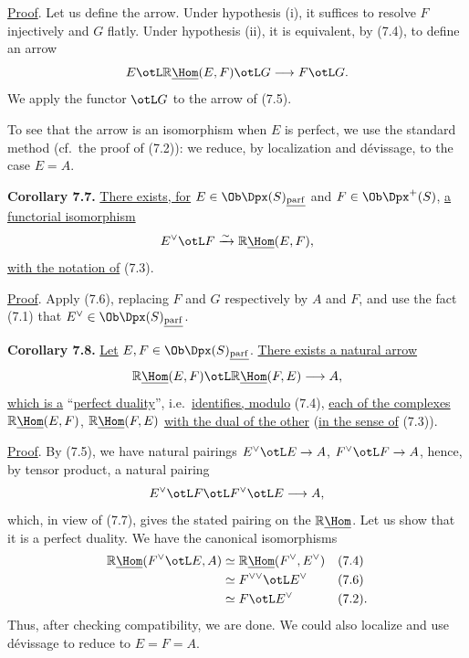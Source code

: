 \uline{Proof}. Let us define the arrow. Under hypothesis (i), it suffices to resolve \(F\) injectively and \(G\) flatly. Under hypothesis (ii), it is equivalent, by (7.4), to define an arrow
\[
  E\otL\mathbb{R}\underline{\Hom}(E,F)\otL G\longrightarrow F\otL G.
\]
We apply the functor \(\otL G\) to the arrow of (7.5).

To see that the arrow is an isomorphism when \(E\) is perfect, we use the standard method (cf.\ the proof of (7.2)): we reduce, by localization and dévissage, to the case \(E=A\).

%
\textbf{Corollary 7.7.} \uline{There exists, for} \(E\in\Ob\Dpx(S)_{\underline{\mathrm{parf}}}\) and \(F\in\Ob\Dpx^+(S)\), \uline{a functorial isomorphism}
\[
  E^\vee\otL F\xrightarrow{\sim}\mathbb{R}\underline{\Hom}(E,F),
\]
\uline{with the notation of} (7.3).

\uline{Proof}. Apply (7.6), replacing \(F\) and \(G\) respectively by \(A\) and \(F\), and use the fact (7.1) that \(E^\vee\in\Ob\Dpx(S)_{\underline{\mathrm{parf}}}\).

\textbf{Corollary 7.8.} \uline{Let} \(E,F\in\Ob\Dpx(S)_{\underline{\mathrm{parf}}}\). \uline{There exists a natural arrow}
\[
  \mathbb{R}\underline{\Hom}(E,F)\otL\mathbb{R}\underline{\Hom}(F,E)\longrightarrow A,
\]
\uline{which is a} ``\uline{perfect duality}'', i.e.\ \uline{identifies, modulo} (7.4), \uline{each of the complexes} \(\mathbb{R}\underline{\Hom}(E,F)\), \(\mathbb{R}\underline{\Hom}(F,E)\) \uline{with the dual of the other} (\uline{in the sense of} (7.3)).

\uline{Proof}. By (7.5), we have natural pairings \(E^\vee\otL E\to A\), \(F^\vee\otL F\to A\), hence, by tensor product, a natural pairing
\[
  E^\vee\otL F\otL F^\vee\otL E\longrightarrow A,
\]
which, in view of (7.7), gives the stated pairing on the \(\mathbb{R}\underline{\Hom}\). Let us show that it is a perfect duality. We have the canonical isomorphisms
\[
\begin{aligned}
\mathbb{R}\underline{\Hom}(F^\vee\otL E,A)&\simeq\mathbb{R}\underline{\Hom}(F^\vee,E^\vee) &&(7.4)\\
&\simeq F^{\vee\vee}\otL E^\vee &&(7.6)\\
&\simeq F\otL E^\vee &&(7.2).
\end{aligned}
\]
Thus, after checking compatibility, we are done. We could also localize and use dévissage to reduce to \(E=F=A\).

